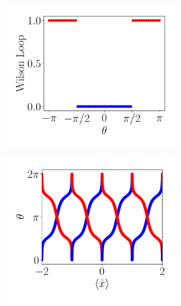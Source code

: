 \begin{figure}[tbh!]
\begin{subfigure}[b!]{0.25 \textwidth}
     \end{subfigure}\hspace*{-0.9em}
     \begin{subfigure}[b!]{0.25 \textwidth}
         \caption{}
         \includegraphics[width=\textwidth]{Imagenes/Shh_images/winding_shh_pump.pdf}
     \end{subfigure}\hspace*{-0.9em}
     \begin{subfigure}[b!]{0.25 \textwidth}
         \caption{}
         \includegraphics[width=\textwidth]{Imagenes/Shh_images/wannier_center_shh_pump.pdf}

\end{subfigure}
\end{figure}
